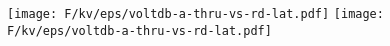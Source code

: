 
\def \hmina {\hspace{-0.1in}}
\def \hminb {\hspace{-0.1in}}

\def \fgw {1.78in}
\def \fgh {1.085in}


\begin{figure}[t!]
\centerline{
\hmina
\texttt{[image: F/kv/eps/voltdb-a-thru-vs-rd-lat.pdf]}
\hminb
\texttt{[image: F/kv/eps/voltdb-a-thru-vs-rd-lat.pdf]}
}

\vminten


\vminfifteen

\end{figure}

